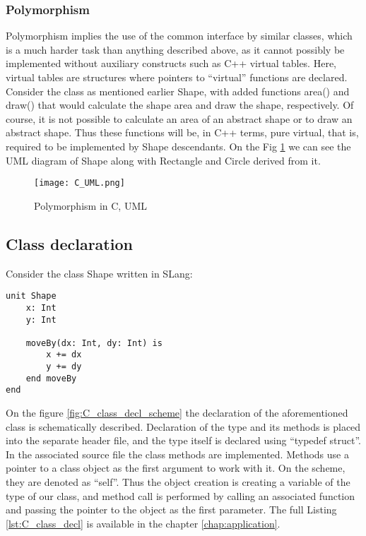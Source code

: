 \subsubsection{Polymorphism}
Polymorphism implies the use of the common interface by similar classes, which is a much harder task than anything described above, as it cannot possibly be implemented without auxiliary constructs such as C++ virtual tables. 
Here, virtual tables are structures where pointers to ``virtual'' functions are declared. 
Consider the class as mentioned earlier Shape, with added functions area() and draw() that would calculate the shape area and draw the shape, respectively. 
Of course, it is not possible to calculate an area of an abstract shape or to draw an abstract shape. Thus these functions will be, in C++ terms, pure virtual, that is, required to be implemented by Shape descendants. On the Fig \ref{fig:C_UML} we can see the UML diagram of Shape along with Rectangle and Circle derived from it.

\begin{figure}[h!]
    \centering
    \texttt{[image: C\_UML.png]}
    \caption{Polymorphism in C, UML}
    \label{fig:C_UML}
\end{figure}

\subsection{Class declaration}
Consider the class Shape written in SLang:
\begin{lstlisting}[morekeywords={unit, end, is}, caption={Class declaration in Slang}, label={lst:Slang_class_decl}]
unit Shape 
    x: Int
    y: Int

    moveBy(dx: Int, dy: Int) is
        x += dx
        y += dy
    end moveBy
end
\end{lstlisting}

On the figure \ref{fig:C_class_decl_scheme} the declaration of the aforementioned class is schematically described. Declaration of the type and its methods is placed into the separate header file, and the type itself is declared using ``typedef struct''. In the associated source file the class methods are implemented. Methods use a pointer to a class object as the first argument to work with it. On the scheme, they are denoted as ``self''. Thus the object creation is creating a variable of the type of our class, and method call is performed by calling an associated function and passing the pointer to the object as the first parameter. The full Listing \ref{lst:C_class_decl} is available in the chapter \ref{chap:application}.

